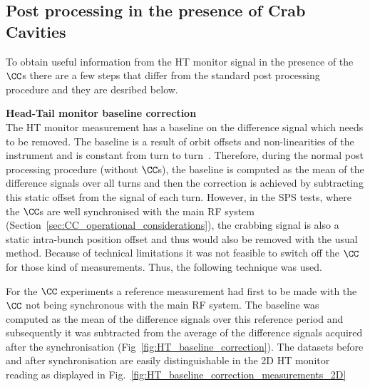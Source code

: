 \subsection{Post processing in the presence of Crab Cavities}\label{subsec:HT_post_process_CC}
To obtain useful information from the HT monitor signal in the presence of the $\CC$s there are a few steps that differ from the standard post processing procedure and they are desribed below.

\normalsize{\textbf{Head-Tail monitor baseline correction}}\\
The HT monitor measurement has a baseline on the difference signal which needs to be removed. The baseline is a result of orbit offsets and non-linearities of the instrument and is constant from turn to turn~\cite{Levens:2313358}. Therefore, during the normal post processing procedure (without $\CC$s), the baseline is computed as the mean of the difference signals over all turns and then the correction is achieved by subtracting this static offset from the signal of each turn. However, in the SPS tests, where the $\CC$s are well synchronised with the main RF system (Section~\ref{sec:CC_operational_considerations}), the crabbing signal is also a static intra-bunch position offset and thus would also be removed with the usual method. Because of technical limitations it was not feasible to switch off the $\CC$ for those kind of measurements. Thus, the following technique was used. 

For the $\CC$ experiments a reference measurement had first to be made with the $\CC$ not being synchronous with the main RF system. The baseline was computed as the mean of the difference signals over this reference period and subsequently it was subtracted from the average of the difference signals acquired after the synchronisation (Fig~\ref{fig:HT_baseline_correction}). The datasets before and after synchronisation are easily distinguishable in the 2D HT monitor reading as displayed in Fig.~\ref{fig:HT_baseline_correction_measurements_2D}


